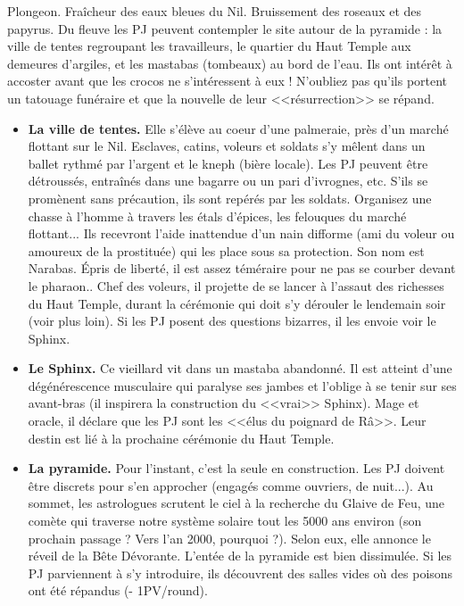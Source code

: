 \documentclass[11pt,twoside,a4paper]{book}
\begin{document}
Plongeon. Fra{\^i}cheur des eaux bleues du Nil. Bruissement des roseaux et des papyrus. Du fleuve les PJ peuvent contempler le site autour de la pyramide : la ville de tentes regroupant les travailleurs, le quartier du Haut Temple aux demeures d'argiles, et les mastabas (tombeaux) au bord de l'eau. Ils ont int{\'e}r{\^e}t {\`a} accoster avant que les crocos ne s'int{\'e}ressent {\`a} eux ! N'oubliez pas qu'ils portent un tatouage fun{\'e}raire et que la nouvelle de leur <<r{\'e}surrection>> se r{\'e}pand.%
\setlength\parindent{20pt}
\begin{itemize}
	\item \textbf{La ville de tentes. }Elle s'{\'e}l{\`e}ve au coeur d'une palmeraie, pr{\`e}s d'un march{\'e} flottant sur le Nil. Esclaves, catins, voleurs et soldats s'y m{\^e}lent dans un ballet rythm{\'e} par l'argent et le kneph (bi{\`e}re locale). Les PJ peuvent {\^e}tre d{\'e}trouss{\'e}s, entra{\^i}n{\'e}s dans une bagarre ou un pari d'ivrognes, etc. S'ils se prom{\`e}nent sans pr{\'e}caution, ils sont rep{\'e}r{\'e}s par les soldats. Organisez une chasse {\`a} l'homme {\`a} travers les {\'e}tals d'{\'e}pices, les felouques du march{\'e} flottant... Ils recevront l'aide inattendue d'un nain difforme (ami du voleur ou amoureux de la prostitu{\'e}e) qui les place sous sa protection. Son nom est Narabas. {\'E}pris de libert{\'e}, il est assez t{\'e}m{\'e}raire pour ne pas se courber devant le pharaon.. Chef des voleurs, il projette de se lancer {\`a} l'assaut des richesses du Haut Temple, durant la c{\'e}r{\'e}monie qui doit s'y d{\'e}rouler le lendemain soir (voir plus loin). Si les PJ posent des questions bizarres, il les envoie voir le Sphinx.
	\item \textbf{Le Sphinx. }Ce vieillard vit dans un mastaba abandonn{\'e}. Il est atteint d'une d{\'e}g{\'e}n{\'e}rescence musculaire qui paralyse ses jambes et l'oblige {\`a} se tenir sur ses avant-bras (il inspirera la construction du <<vrai>> Sphinx). Mage et oracle, il d{\'e}clare que les PJ sont les <<{\'e}lus du poignard de R{\^a}>>. Leur destin est li{\'e} {\`a} la prochaine c{\'e}r{\'e}monie du Haut Temple.
	\item \textbf{La pyramide. }Pour l'instant, c'est la seule en construction. Les PJ doivent {\^e}tre discrets pour s'en approcher (engag{\'e}s comme ouvriers, de nuit...). Au sommet, les astrologues scrutent le ciel {\`a} la recherche du Glaive de Feu, une com{\`e}te qui traverse notre syst{\`e}me solaire tout les 5000 ans environ (son prochain passage ? Vers l'an 2000, pourquoi ?). Selon eux, elle annonce le r{\'e}veil de la B{\^e}te D{\'e}vorante. L'ent{\'e}e de la pyramide est bien dissimul{\'e}e. Si les PJ parviennent {\`a} s'y introduire, ils d{\'e}couvrent des salles vides o{\`u} des poisons ont {\'e}t{\'e} r{\'e}pandus (- 1PV/round).

\end{itemize}
\end{document}
